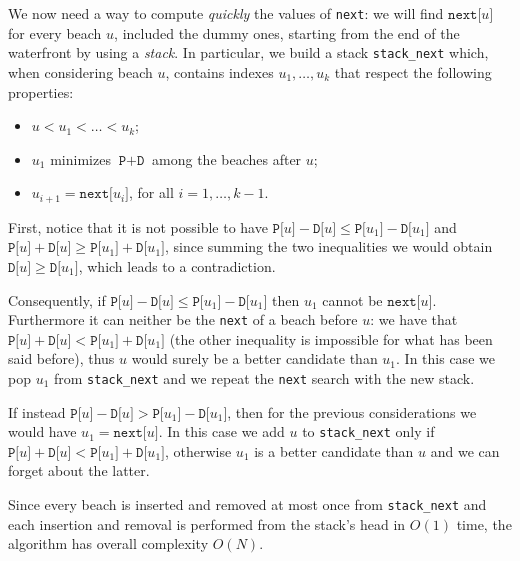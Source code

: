 We now need a way to compute \emph{quickly} the values of \texttt{next}: we will find $\texttt{next[}u\texttt{]}$ for every beach $u$, included the dummy ones, starting from the end of the waterfront by using a \emph{stack}.
In particular, we build a stack \texttt{stack\_next} which, when considering beach $u$, contains indexes $u_1,\ldots,u_k$ that respect the following properties:
\begin{itemize}
 \item $u < u_1 < \ldots < u_k$;
 \item $u_1$ minimizes $\texttt{P}+\texttt{D}$ among the beaches after $u$;
 \item $u_{i+1} = \texttt{next[}u_i \texttt{]}$, for all $i=1,\ldots, k-1$.
\end{itemize}

First, notice that it is not possible to have $\texttt{P[}u \texttt{]} - \texttt{D[}u\texttt{]} \le \texttt{P[}u_1 \texttt{]} - \texttt{D[}u_1\texttt{]}$ and $\texttt{P[}u \texttt{]} + \texttt{D[}u\texttt{]} \ge \texttt{P[}u_1 \texttt{]} + \texttt{D[}u_1\texttt{]}$, since summing the two inequalities we would obtain $\texttt{D[}u\texttt{]} \ge \texttt{D[}u_1\texttt{]}$, which leads to a contradiction.

Consequently, if $\texttt{P[}u \texttt{]} - \texttt{D[}u\texttt{]} \le \texttt{P[}u_1 \texttt{]} - \texttt{D[}u_1 \texttt{]}$ then $u_1$ cannot be $\texttt{next[}u\texttt{]}$. Furthermore it can neither be the \texttt{next} of a beach before $u$: we have that $\texttt{P[}u \texttt{]} + \texttt{D[}u\texttt{]} < \texttt{P[}u_1 \texttt{]} + \texttt{D[}u_1\texttt{]}$ (the other inequality is impossible for what has been said before), thus $u$ would surely be a better candidate than $u_1$.
In this case we pop $u_1$ from \texttt{stack\_next} and we repeat the \texttt{next} search with the new stack.

If instead $\texttt{P[}u \texttt{]} - \texttt{D[}u\texttt{]} > \texttt{P[}u_1 \texttt{]} - \texttt{D[}u_1 \texttt{]}$, then for the previous considerations we would have $u_1 = \texttt{next[}u\texttt{]}$. In this case we add $u$ to \texttt{stack\_next} only if $\texttt{P[}u \texttt{]} + \texttt{D[}u\texttt{]} < \texttt{P[}u_1 \texttt{]} + \texttt{D[}u_1 \texttt{]}$, otherwise $u_1$ is a better candidate than $u$ and we can forget about the latter.

Since every beach is inserted and removed at most once from \texttt{stack\_next} and each insertion and removal is performed from the stack's head in $O(1)$ time, the algorithm has overall complexity $O(N)$.


\CppSolution

%
\colorbox{white}{}

\afterpage{\nopagecolor}
